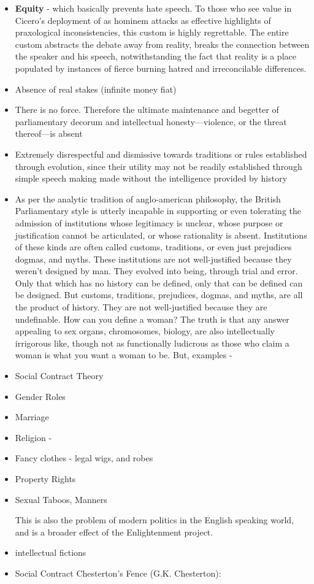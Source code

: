 \begin{itemize}
    \item \textbf{Equity} - which basically prevents hate speech. To those who see value in Cicero's deployment of as hominem attacks as effective highlights of praxological inconsistencies, this custom is highly regrettable. The entire custom abstracts the debate away from reality, breaks the connection between the speaker and his speech, notwithstanding the fact that reality is a place populated by instances of fierce burning hatred and irreconcilable differences.
    
        
        \item Absence of real stakes (infinite money fiat)
        
        
        
        \item There is no force. Therefore the ultimate maintenance and begetter of parliamentary decorum and intellectual honesty—violence, or the threat thereof—is absent
        \item Extremely disrespectful and dismissive towards traditions or rules established through evolution, since their utility may not be readily established through simple speech making made without the intelligence provided by history 
        \item As per the analytic tradition of anglo-american philosophy, the British Parliamentary style is utterly incapable in supporting or even tolerating the admission of institutions whose legitimacy is unclear, whose purpose or justification cannot be articulated, or whose rationality is absent. Institutions of these kinds are often called customs, traditions, or even just prejudices dogmas, and myths. These institutions are not well-justified because they weren't designed by man. They evolved into being, through trial and error. Only that which has no history can be defined, only that can be defined can be designed. But customs, traditions, prejudices, dogmas, and myths, are all the product of history. They are not well-justified because they are undefinable. How can you define a woman? The truth is that any answer appealing to sex organs, chromosomes, biology, are also intellectually irrigorous like, though not as functionally ludicrous as those who claim a woman is what you want a woman to be. But, examples - 
        \item Social Contract Theory 
        \item Gender Roles 
        \item Marriage
        \item Religion -
        \item Fancy clothes - legal wigs, and robes 
        \item Property Rights 
        \item Sexual Taboos, Manners
        
        This is also the problem of modern politics in the English speaking world, and is a broader effect of the Enlightenment project.
        \item intellectual fictions 
        \item Social Contract 
        Chesterton’s Fence (G.K. Chesterton):
    
\end{itemize}
